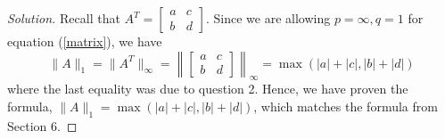 \documentclass{article}
\begin{document}
\begin{proof}[Solution]\let\qed\relax
	Recall that $A^T = \begin{bmatrix} a & c \\ b & d \end{bmatrix}$.
	Since we are allowing $p=\infty,q=1$ for equation (\ref{matrix}), we have
	\[
		\lVert A \rVert_1
		= \lVert A^T \lVert_\infty
		= \left\lVert \begin{bmatrix} a & c \\ b & d \end{bmatrix} \right\rVert_\infty
		= \max(|a| + |c|, |b| + |d|)
	\]
	where the last equality was due to question 2.
	Hence, we have proven the formula, $\lVert A \rVert_1 = \max(|a| + |c|, |b| + |d|)$,
	which matches the formula from Section 6.
\end{proof}
\end{document}

